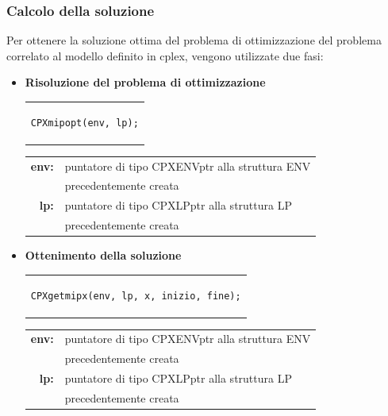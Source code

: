 \subsubsection{Calcolo della soluzione}
Per ottenere la soluzione ottima del problema di ottimizzazione del problema correlato al modello definito in cplex, vengono utilizzate due fasi:
\begin{itemize}
\item{\textbf{Risoluzione del problema di ottimizzazione}\\
\begin{center}
\begin{tabular}{c}
\begin{lstlisting}[linewidth=120pt, basicstyle=\footnotesize\sffamily,]
CPXmipopt(env, lp);
\end{lstlisting}
\end{tabular}
\end{center}
\begin{table}[h]
\centering
\begin{tabular}{rl}
\textbf{env:} & {puntatore di tipo CPXENVptr alla struttura ENV}\\
& {precedentemente creata}\\
\textbf{lp:} & {puntatore di tipo CPXLPptr alla struttura LP}\\
& {precedentemente creata}\\
\end{tabular}
\end{table}
}
\item{\textbf{Ottenimento della soluzione}\\
\begin{center}
\begin{tabular}{c}
\begin{lstlisting}[linewidth=230pt, basicstyle=\footnotesize\sffamily,]
CPXgetmipx(env, lp, x, inizio, fine);
\end{lstlisting}
\end{tabular}
\end{center}
\begin{table}[h]
\centering
\begin{tabular}{rl}
\textbf{env:} & {puntatore di tipo CPXENVptr alla struttura ENV}\\
& {precedentemente creata}\\
\textbf{lp:} & {puntatore di tipo CPXLPptr alla struttura LP}\\
& {precedentemente creata}\\
\end{tabular}

\end{table}}
\end{itemize}
